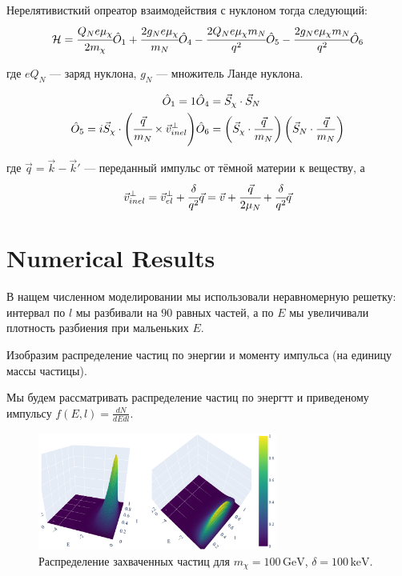 \documentclass[a4paper, 14pt]{article}
\begin{document}
Нерелятивисткий опреатор взаимодействия с нуклоном тогда следующий:
\begin{equation}
	\mathcal{H} = 
	\cfrac{Q_N e\mu_{\chi}}{2m_{\chi}} \hat{O}_1 + 
	\cfrac{2g_N e\mu_{\chi}}{m_{N}} \hat{O}_4-
	\cfrac{2Q_N e\mu_{\chi} m_{N} }{q^2} \hat{O}_5 -
	\cfrac{2g_N e\mu_{\chi} m_{N}}{q^2} \hat{O}_6
\end{equation}

где $e Q_N$ --- заряд нуклона,  $g_N$ --- множитель Ланде нуклона.


\begin{eqnarray}
	\hat{O}_1 = 1 & 
	\hat{O}_4 = \vec{S}_{\chi}\cdot\vec{S}_{N} \\
	\hat{O}_5 = i\vec{S}_{\chi}\cdot \left(\cfrac{\vec{q}}{m_N} \times \vec{v}^{\perp}_{inel} \right) & 
	\hat{O}_6 = \left(\vec{S}_{\chi} \cdot \frac{\vec{q}}{m_N}\right)\left(\vec{S}_N \cdot \frac{\vec{q}}{m_N}\right)
\end{eqnarray}

где $\vec{q} = \vec{k} - \vec{k}'$ --- переданный импульс от тёмной материи к веществу, а 
\begin{equation}
	\vec{v}^{\perp}_{inel} = \vec{v}^{\perp}_{el} + \cfrac{\delta}{q^2} \vec{q} = \vec{v}+\cfrac{\vec{q}}{2\mu_{N}} + \cfrac{\delta}{q^2} \vec{q}
\end{equation}

	
	
	
	\section{Numerical Results}
%    
В нащем численном моделировании мы использовали неравномерную решетку: интервал по $l$ мы разбивали на $90$ равных частей, а по $E$ мы увеличивали плотность разбиения при мальеньких $E$.

Изобразим распределение частиц по энергии и моменту импульса (на единицу массы частицы). 

Мы будем рассматривать распределение частиц по энергтт и приведеному импульсу $f(E,l) = \frac{dN}{dE dl}$.

\begin{figure}[ht]
	\centering
	\includegraphics[width=0.7\textwidth]
	{images/Capt100_100.png}
	\caption{Распределение захваченных частиц для $m_{\chi} = 100\, \text{GeV}$, $\delta = 100\, \text{keV}$.}
	\label{fig:Capt100_100}
\end{figure}
\end{document}

